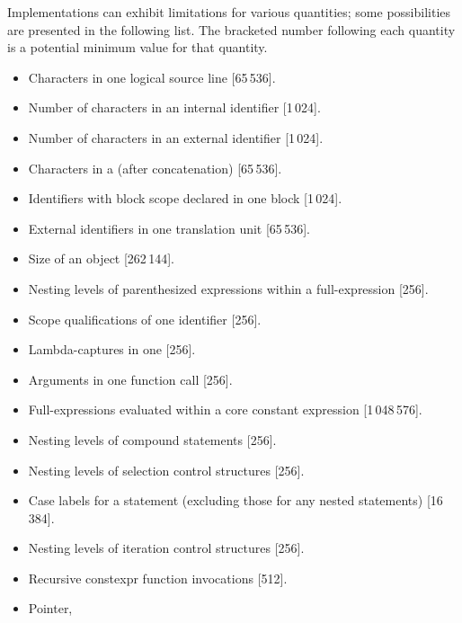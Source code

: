 
\pnum
Implementations can exhibit limitations for various quantities;
some possibilities are presented in the following list.
The bracketed number following each quantity is
a potential minimum value for that quantity.
\begin{itemize}
\item%
Characters in one logical source line [65\,536].
\item%
Number of characters in an internal identifier [1\,024].
\item%
Number of
characters in an external identifier [1\,024].
\item%
Characters in a 
(after concatenation) [65\,536].
\item%
Identifiers with block scope declared in one block [1\,024].
\item%
External identifiers in one translation unit [65\,536].
\item%
Size of an object [262\,144].
\item%
Nesting levels of parenthesized expressions within a full-expression [256].
\item%
Scope qualifications of one identifier [256].
\item%
Lambda-captures in one  [256].
\item%
Arguments in one function call [256].
\item%
Full-expressions evaluated within a core constant expression [1\,048\,576].
\item%
Nesting levels of compound statements [256].
\item%
Nesting levels of selection control structures [256].
\item%
Case labels for a
statement (excluding those for any nested
statements)
[16\,384].
\item%
Nesting levels of iteration control structures [256].
\item%
Recursive constexpr function invocations [512].
\item%
Pointer,

\end{itemize}
